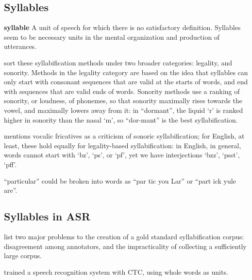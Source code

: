 \documentclass{article}[11pt]
\begin{document}


\subsection{Syllables}

\begin{displayquote}
\textbf{syllable} A unit of speech for which there is
no satisfactory definition. Syllables seem to
be necessary units in the mental organization and production of utterances.~\citep{ladefoged_course_2011}
\end{displayquote}

\citet{goslin_comparing_2007} sort these syllabification methods under two broader categories: legality, and sonority. Methods in the legality category are based on the idea that syllables can only start with consonant sequences that are valid at the starts of words, and end with sequences that are valid ends of words. Sonority methods use a ranking of sonority, or loudness, of phonemes, so that sonority maximally rises towards the vowel, and maximally lowers away from it: in ``dormant'', the liquid `r' is ranked higher in sonority than the nasal `m', so ``dor-mant'' is the best syllabification.

\citet{saussure_course_1959} mentions vocalic fricatives as a criticism of sonoric syllabification; for English, at least, these hold equally for legality-based syllabification: in English, in general, words cannot start with `bz', `ps', or `pf', yet we have interjections `bzz', `psst', `pff'.

``particular'' could be broken into words as ``par tic you Lar'' or ``part ick yule are''.

\subsection{Syllables in ASR}

\citep{fujimura_syllable_1975}

\citet{marchand_automatic_2009} list two major problems to the creation of a gold standard syllabification corpus: disagreement among annotators, and the impracticality of collecting a sufficiently large corpus.

\citet{soltau_neural_2017} trained a speech recognition system with CTC, using whole words as units.



%
\end{document}
